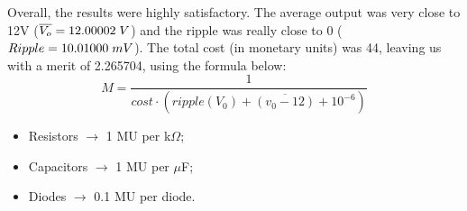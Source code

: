 \clearpage

Overall, the results were highly satisfactory. The average output was very close to 12V ($\overline{V_{o}}=12.00002\hspace{1mm}V$)
and the ripple was really close to 0 ($Ripple=10.01000\hspace{1mm}mV$).
The total cost (in monetary units) was 44, leaving us with a merit of 2.265704, using the formula below:
\begin{equation}
  M=\dfrac{1}{cost\cdot \left( ripple\left( V_{0}\right) +\overline{\left( v_{0}-12\right) }+10^{-6}\right) }
\end{equation}
\begin{itemize}
  \item Resistors $\rightarrow$ 1 MU per k$\Omega$;
  \item Capacitors $\rightarrow$ 1 MU per $\mu$F;
  \item Diodes $\rightarrow$ 0.1 MU per diode.
\end{itemize}
